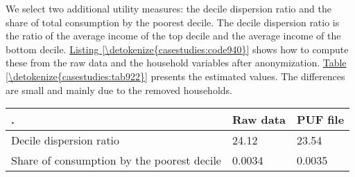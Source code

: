 \documentclass[letterpaper,10pt,english]{sphinxmanual}
\begin{document}
We select two additional utility measures: the decile dispersion ratio
and the share of total consumption by the poorest decile. The decile
dispersion ratio is the ratio of the average income of the top decile
and the average income of the bottom decile. \hyperref[\detokenize{casestudies:code940}]{Listing \ref{\detokenize{casestudies:code940}}} shows how to
compute these from the raw data and the household variables after
anonymization. \hyperref[\detokenize{casestudies:tab922}]{Table \ref{\detokenize{casestudies:tab922}}} presents the estimated values. The differences
are small and mainly due to the removed households.


\begin{savenotes}\sphinxattablestart
\centering
{}
\label{\detokenize{casestudies:tab922}}\label{\detokenize{casestudies:id43}}
\sphinxaftercaption
\begin{tabulary}{\linewidth}[t]{|T|T|T|}
\hline
\sphinxstyletheadfamily 
.
&\sphinxstyletheadfamily 
Raw data
&\sphinxstyletheadfamily 
PUF file
\\
\hline
Decile dispersion ratio
&
24.12
&
23.54
\\
\hline
Share of consumption by the poorest decile
&
0.0034
&
0.0035
\\
\hline
\end{tabulary}
\par
\sphinxattableend\end{savenotes}
\end{document}
